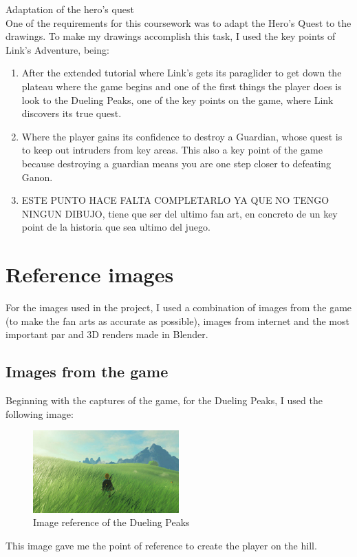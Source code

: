 \documentclass{cup-pan}
\begin{document}
    \textcolor{PANDarkBlue}{\large Adaptation of the hero's quest}\\
    One of the requirements for this coursework was to adapt the Hero's Quest to the drawings.
    To make my drawings accomplish this task, I used the key points of Link's Adventure, being:\\
        \begin{enumerate}
            \item After the extended tutorial where Link's gets its paraglider to get down the plateau where the game begins and one of the first things the player does is look to the Dueling Peaks, one of the key points on the game, where Link discovers its true quest.\\
            \item Where the player gains its confidence to destroy a Guardian, whose quest is to keep out intruders from key areas. This also a key point of the game because destroying a guardian means you are one step closer to defeating Ganon. \\
            \item ESTE PUNTO HACE FALTA COMPLETARLO YA QUE NO TENGO NINGUN DIBUJO, tiene que ser del ultimo fan art, en concreto de un key point de la historia que sea ultimo del juego. \\
        \end{enumerate}


\section{Reference images}

    For the images used in the project, I used a combination of images from the game (to make the fan arts as accurate as possible), images from internet and the most important par and 3D renders made in Blender.\\

    \subsection*{Images from the game}
    Beginning with the captures of the game, for the Dueling Peaks, I used the following image:\\
    \begin{figure}[H]
        \includegraphics[width=0.5\textwidth]{Imagenes/Referencias/article_img03_1.jpg}
        \caption{Image reference of the Dueling Peaks}
    \end{figure}
    This image gave me the point of reference to create the player on the hill. 
\end{document}
